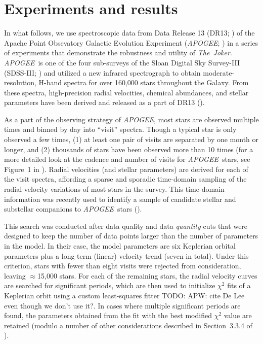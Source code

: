 \documentclass[manuscript, letterpaper]{aastex6}
\newcommand{\project}[1]{\textsl{#1}}
\newcommand{\acronym}[1]{{\small{#1}}}
\newcommand{\apogee}{\project{\acronym{APOGEE}}}
\newcommand{\samplername}{\project{The~Joker}}
\newcommand{\sectionname}{Section}
\newcommand{\figname}{Figure}
\newcommand{\todo}[1]{{\color{red}TODO: #1}}
\begin{document}
\section{Experiments and results}

In what follows, we use spectroscopic data from Data Release 13 (DR13;
\citealt{SDSS-Collaboration:2016}) of the Apache Point Obsevatory Galactic
Evolution Experiment (\apogee; \citealt{Majewski:2015}) in a series of
experiments that demonstrate the robustness and utility of \samplername.
\apogee\ is one of the four sub-surveys of the Sloan Digital Sky Survey-III
(SDSS-III; \citealt{Eisenstein:2011}) and utilized a new infrared spectrograph
to obtain moderate-resolution, H-band spectra for over 160,000 stars throughout
the Galaxy.
From these spectra, high-precision radial velocities, chemical abundances, and
stellar parameters have been derived and released as a part of DR13
(\citealt{Holtzman:2015,Nidever:2015}).

As a part of the observing strategy of \apogee, most stars are observed
multiple times and binned by day into ``visit'' spectra.
Though a typical star is only observed a few times, (1) at least one pair of
visits are separated by one month or longer, and (2) thousands of stars have
been observed more than 10 times (for a more detailed look at the cadence and
number of visits for \apogee\ stars, see \figname~1 in \citealt{Troup:2016}).
Radial velocities (and stellar parameters) are derived for each of the visit
spectra, affording a sparse and sporadic time-domain sampling of the radial
velocity variations of most stars in the survey.
This time-domain information was recently used to identify a sample of
candidate stellar and substellar companions to \apogee\ stars
(\citealt{Troup:2016}).

This search was conducted after data quality and data \emph{quantity} cuts that
were designed to keep the number of data points larger than the number of
parameters in the model.
In their case, the model parameters are six Keplerian orbital parameters plus a
long-term (linear) velocity trend (seven in total).
Under this criterion, stars with fewer than eight visits were rejected from
consideration, leaving $\approx$15,000 stars.
For each of the remaining stars, the radial velocity curves are searched for
significant periods, which are then used to initialize $\chi^2$ fits of a
Keplerian orbit using a custom least-squares fitter \todo{APW: cite De Lee even
though we don't use it?}.
In cases where multiple significant periods are found, the parameters obtained
from the fit with the best modified $\chi^2$ value are retained (modulo a
number of other considerations described in \sectionname~3.3.4 of
\citealt{Troup:2016}).
\end{document}
